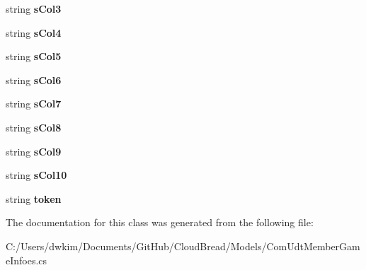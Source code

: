 \begin{DoxyCompactItemize}
\item 
string {\bfseries s\+Col3}\hypertarget{a00069_aed58f425df1cb2ff66fce213575fe314}{}\label{a00069_aed58f425df1cb2ff66fce213575fe314}

\item 
string {\bfseries s\+Col4}\hypertarget{a00069_ace68e6415049a8609ec58b2b63bccba9}{}\label{a00069_ace68e6415049a8609ec58b2b63bccba9}

\item 
string {\bfseries s\+Col5}\hypertarget{a00069_af2572abee4769b156bd669bcfb31c06e}{}\label{a00069_af2572abee4769b156bd669bcfb31c06e}

\item 
string {\bfseries s\+Col6}\hypertarget{a00069_a85f8defab1cdf659240b167fd901801d}{}\label{a00069_a85f8defab1cdf659240b167fd901801d}

\item 
string {\bfseries s\+Col7}\hypertarget{a00069_a948c37cec7bad51ce71bb408489c3096}{}\label{a00069_a948c37cec7bad51ce71bb408489c3096}

\item 
string {\bfseries s\+Col8}\hypertarget{a00069_add487d2b86d5f499be095d4fc1d13660}{}\label{a00069_add487d2b86d5f499be095d4fc1d13660}

\item 
string {\bfseries s\+Col9}\hypertarget{a00069_a04e0b2d3bedbd2e130f1d9cc892b4641}{}\label{a00069_a04e0b2d3bedbd2e130f1d9cc892b4641}

\item 
string {\bfseries s\+Col10}\hypertarget{a00069_abc19d342cecd530319a9bebbcdf67f46}{}\label{a00069_abc19d342cecd530319a9bebbcdf67f46}

\item 
string {\bfseries token}\hypertarget{a00069_a4093b818af1e50eb941e4c4845483f19}{}\label{a00069_a4093b818af1e50eb941e4c4845483f19}

\end{DoxyCompactItemize}


The documentation for this class was generated from the following file\+:\begin{DoxyCompactItemize}
\item 
C\+:/\+Users/dwkim/\+Documents/\+Git\+Hub/\+Cloud\+Bread/\+Models/Com\+Udt\+Member\+Game\+Infoes.\+cs\end{DoxyCompactItemize}
